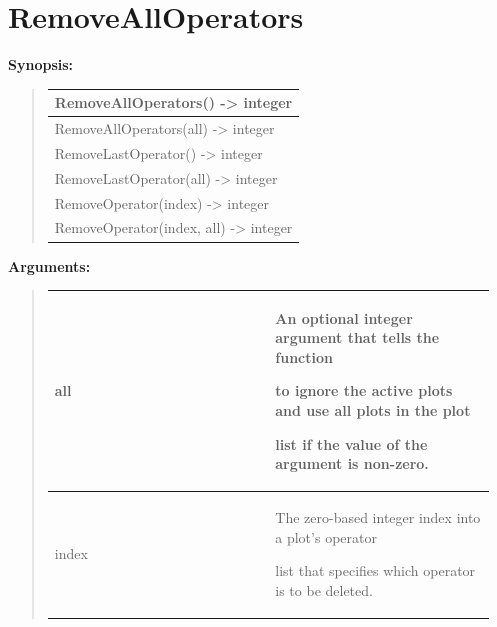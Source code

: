 \documentclass[letterpaper,10pt,english]{sphinxmanual}
\begin{document}
\section{RemoveAllOperators}
\label{functions:removealloperators}
\begin{DUlineblock}{0em}
\item[] \textbf{Synopsis:}
\end{DUlineblock}
\begin{quote}

\begin{tabulary}{\linewidth}{|L|}
\hline

RemoveAllOperators() -\textgreater{} integer
\\
\hline
RemoveAllOperators(all) -\textgreater{} integer
\\
\hline
RemoveLastOperator() -\textgreater{} integer
\\
\hline
RemoveLastOperator(all) -\textgreater{} integer
\\
\hline
RemoveOperator(index) -\textgreater{} integer
\\
\hline
RemoveOperator(index, all) -\textgreater{} integer
\\
\hline\end{tabulary}

\end{quote}

\begin{DUlineblock}{0em}
\item[] 
\item[] \textbf{Arguments:}
\end{DUlineblock}
\begin{quote}

\begin{tabular}{|p{0.475\linewidth}|p{0.475\linewidth}|}
\hline

all
 & 
\begin{DUlineblock}{0em}
\item[] An optional integer argument that tells the function
\item[] to ignore the active plots and use all plots in the plot
\item[] list if the value of the argument is non-zero.
\end{DUlineblock}
\\
\hline
index
 & 
\begin{DUlineblock}{0em}
\item[] The zero-based integer index into a plot's operator
\item[] list that specifies which operator is to be deleted.
\end{DUlineblock}
\\
\hline\end{tabular}

\end{quote}
\end{document}
